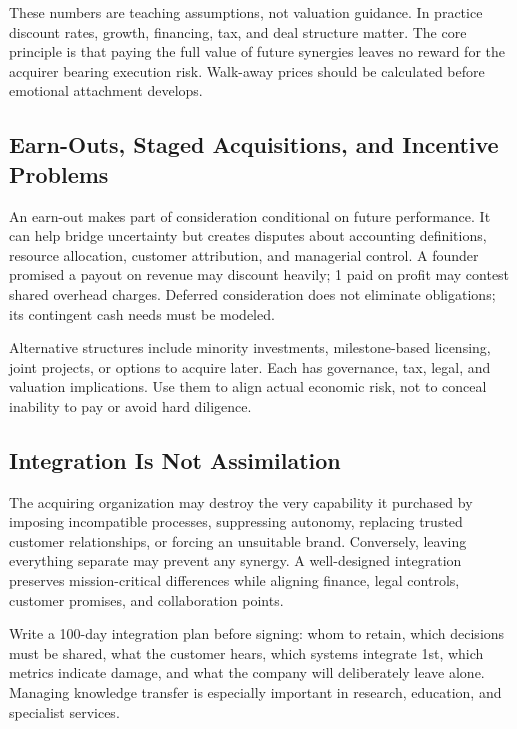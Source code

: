 These numbers are teaching assumptions, not valuation guidance. In practice discount rates, growth, financing, tax, and deal structure matter. The core principle is that paying the full value of future synergies leaves no reward for the acquirer bearing execution risk. Walk-away prices should be calculated before emotional attachment develops.

\subsection{Earn-Outs, Staged Acquisitions, and Incentive Problems}
\label{sec:earnout_staged_acquisition_incentive_problems}

An earn-out makes part of consideration conditional on future performance. It can help bridge uncertainty but creates disputes about accounting definitions, resource allocation, customer attribution, and managerial control. A founder promised a payout on revenue may discount heavily; 1 paid on profit may contest shared overhead charges. Deferred consideration does not eliminate obligations; its contingent cash needs must be modeled.

Alternative structures include minority investments, milestone-based licensing, joint projects, or options to acquire later. Each has governance, tax, legal, and valuation implications. Use them to align actual economic risk, not to conceal inability to pay or avoid hard diligence.

\subsection{Integration Is Not Assimilation}
\label{sec:integration_not_assimilation}

The acquiring organization may destroy the very capability it purchased by imposing incompatible processes, suppressing autonomy, replacing trusted customer relationships, or forcing an unsuitable brand. Conversely, leaving everything separate may prevent any synergy. A well-designed integration preserves mission-critical differences while aligning finance, legal controls, customer promises, and collaboration points.

Write a 100-day integration plan before signing: whom to retain, which decisions must be shared, what the customer hears, which systems integrate 1st, which metrics indicate damage, and what the company will deliberately leave alone. Managing knowledge transfer is especially important in research, education, and specialist services.

